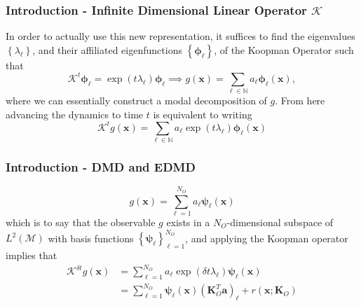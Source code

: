 \documentclass[11pt,aspectratio=169]{beamer}
\newcommand{\bracks}[1]{\left\{#1\right\}}
\newcommand{\N}{\mathbb{N}}
\begin{document}
    \begin{frame}
        \frametitle{Introduction - Infinite Dimensional Linear Operator $\mathcal{K}$}
        In order to actually use this new representation, it suffices to find the 
        eigenvalues $\bracks{\lambda_\ell}$, and their affiliated eigenfunctions 
        $\bracks{\boldsymbol{\phi}_\ell}$, of the Koopman Operator such that
        \begin{equation}
            \mathcal{K}^t\boldsymbol{\phi}_\ell = \exp(t\lambda_\ell)\boldsymbol{\phi}
            _\ell \implies g(\boldsymbol{x}) = \sum_{\ell \in \N} a_\ell \boldsymbol{\phi}_
            \ell(\boldsymbol{x}),    
        \end{equation}
        where we can essentially construct a modal decomposition of $g$. From here 
        advancing the dynamics to time $t$ is equivalent to writing
        \begin{equation}
            \mathcal{K}^{t} g(\boldsymbol{x}) = \sum_{\ell \in \N} a_\ell 
            \exp(t\lambda_\ell)\boldsymbol{\phi}_\ell (\boldsymbol{x})
        \end{equation} 
    \end{frame}

    \begin{frame}
        \frametitle{Introduction - DMD and EDMD}
        \begin{equation}
            g(\boldsymbol{x}) = \sum_{\ell = 1}^{N_O} a_\ell \boldsymbol{\psi}_\ell
            (\boldsymbol{x}) 
        \end{equation}
        which is to say that the observable $g$ exists in a $N_O$-dimensional subspace 
        of $L^2(\mathcal{M})$ with basis functions $\bracks{\boldsymbol{\psi}_\ell}_{\ell=1}^{N_O}$, 
        and applying the Koopman operator implies that
        \begin{align} 
            \mathcal{K}^{\delta t} g(\boldsymbol{x}) &= \sum_{\ell = 1}^{N_O} a_\ell 
            \exp(\delta t\lambda_\ell)\boldsymbol{\psi}_\ell (\boldsymbol{x}) \\
            &= \sum_{\ell = 1}^{N_O} \boldsymbol{\psi}_\ell (\boldsymbol{x})
            (\boldsymbol{K}_O^T
            \boldsymbol{a})_\ell + r(\boldsymbol{x};\boldsymbol{K}_O)
        \end{align}
    \end{frame}
\end{document}
